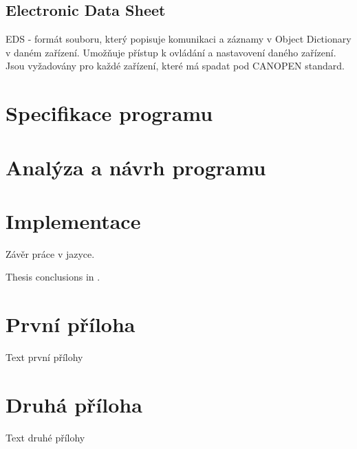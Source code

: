 \documentclass[
  field=ainfk,
  biblatex,
  glossaries,
  index
]{kidiplom}
\begin{document}
\subsection{Electronic Data Sheet}
EDS - formát souboru, který popisuje komunikaci a záznamy v Object Dictionary v daném zařízení. Umožňuje přístup k ovládání a nastavovení daného zařízení. Jsou vyžadovány pro každé zařízení, které má spadat pod CANOPEN standard.

\section{Specifikace programu}

\section{Analýza a návrh programu}

\section{Implementace}

\begin{kiconclusions}
Závěr práce v  jazyce.
\end{kiconclusions}

\begin{kiconclusions}[english]
Thesis conclusions in .
\end{kiconclusions}

\appendix

\section{První příloha}
Text první přílohy

\section{Druhá příloha}
Text druhé přílohy


\printglossary
\end{document}
